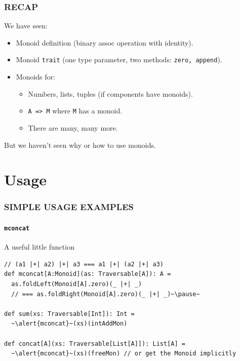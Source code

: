 \documentclass{beamer}
\begin{document}
\begin{frame} \frametitle{RECAP}
  We have seen:
  \begin{itemize}
    \item Monoid definition (binary assoc operation with identity).
    \item Monoid \texttt{trait} (one type parameter,
      two methods: \texttt{zero, append}).
    \item Monoids for:
      \begin{itemize}
      \item Numbers, lists, tuples (if components have monoids).
      \item \texttt{A => M} where \texttt{M} has a monoid.
      \item There are many, many more.
      \end{itemize}
  \end{itemize}

  \begin{block}{}
    \centering
    But we haven't seen \alert{why} or \alert{how} to use monoids.
  \end{block}
\end{frame}

\section{Usage}
\begin{frame}[fragile] \frametitle{SIMPLE USAGE EXAMPLES}
  \framesubtitle{\texttt{mconcat}}

  \begin{block}{A useful little function}
  \begin{lstlisting}
// (a1 |+| a2) |+| a3 === a1 |+| (a2 |+| a3)
def mconcat[A:Monoid](as: Traversable[A]): A =
  as.foldLeft(Monoid[A].zero)(_ |+| _)
  // === as.foldRight(Monoid[A].zero)(_ |+| _)~\pause~

def sum(xs: Traversable[Int]): Int =
  ~\alert{mconcat}~(xs)(intAddMon)

def concat[A](xs: Traversable[List[A]]): List[A] =
  ~\alert{mconcat}~(xs)(freeMon) // or get the Monoid implicitly
  \end{lstlisting}
  \end{block}
\end{frame}
\end{document}
